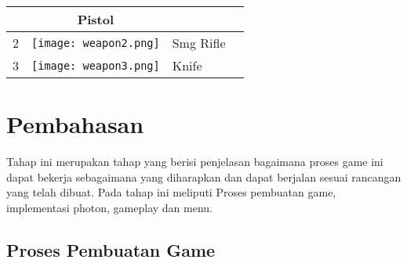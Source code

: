 \begin{enumerate}
\begin{table}[h!]
\begin{tabular}{ | c | c | m{6cm} | m{6cm} | }
\begin{minipage}{.2\textwidth}
            \end{minipage}
            &
            \begin{minipage}{6cm}
                Pistol
            \end{minipage}
            \\ \hline
            2 &
        \begin{minipage}{.2\textwidth}
            \texttt{[image: weapon2.png]}
        \end{minipage}
        &
        \begin{minipage}{6cm}
            Smg Rifle
        \end{minipage}
        \\ \hline
        3 &
        \begin{minipage}{.2\textwidth}
            \texttt{[image: weapon3.png]}
        \end{minipage}
        &
        \begin{minipage}{6cm}
            Knife
        \end{minipage}
        \\ \hline
        \end{tabular}
    \end{table}
\end{enumerate}

\section{Pembahasan}
\noindent

Tahap ini merupakan tahap yang berisi penjelasan bagaimana proses game ini dapat bekerja sebagaimana yang diharapkan dan dapat berjalan sesuai rancangan yang telah dibuat. Pada tahap ini meliputi Proses pembuatan game, implementasi photon, gameplay dan menu.

\subsection{Proses Pembuatan Game}
